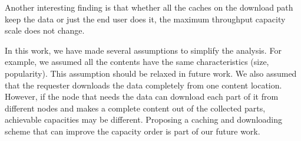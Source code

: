\documentclass[journal]{IEEEtran}
\theoremstyle{plain}
\theoremstyle{remark}
\begin{document}
Another interesting finding is that whether all the caches on the download path keep the data or just the end user does it, the maximum throughput capacity scale does not change. 

In this work, we have made several assumptions to simplify the analysis. For example, we assumed all the contents have the same characteristics (size, popularity). This assumption should be relaxed in future work. We also assumed that the requester downloads the data completely from one content location. However, if the node that needs the data can download each part of it from different nodes and makes a complete content out of the collected parts, achievable capacities may be different. Proposing a caching and downloading scheme that can improve the capacity order is part of our  future work.



\end{document}

